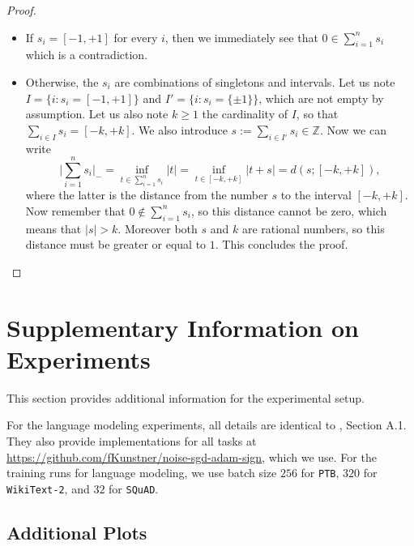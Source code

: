 \documentclass[10pt]{article} %
\begin{document}
\begin{proof}
\begin{itemize}
        \item If $s_i = [-1,+1]$ for every $i$, then we immediately see that $0 \in \sum_{i=1}^n s_i$ which is a contradiction.
        \item Otherwise, the $s_i$ are combinations of singletons and intervals. Let us note $I = \{i : s_i = [-1,+1]\}$ and $I' = \{i : s_i = \{ \pm 1\}\}$, which are not empty by assumption.
        Let us also note $k \geq 1$ the cardinality of $I$, so that $\sum_{i \in I} s_i = [- k , +k]$.
        We also introduce $s := \sum_{i \in I'} s_i \in \mathbb{Z}$.
        Now we can write
        \begin{equation*}
            \vert \sum_{i=1}^n s_i \vert_-
            =
            \inf\limits_{ t \in \sum_{i=1}^n s_i} \vert t \vert 
            =
            \inf\limits_{t \in [-k,+k]} \vert t + s \vert
            =
            d(s;[-k,+k]),
        \end{equation*}
        where the latter is the distance from the number $s$ to the interval $[-k,+k]$.
        Now remember that $0 \notin  \sum_{i=1}^n s_i$, so this distance cannot be zero, which means that $\vert s \vert > k$.
        Moreover both $s$ and $k$ are rational numbers, so  this distance must be greater or equal to $1$. This concludes the proof.
    \end{itemize}
\end{proof}






\section{Supplementary Information on Experiments}\label{sec:app-experiments-supp}
This section provides additional information for the experimental setup.

For the language modeling experiments, all details are identical to \citet{kunstner2023noise}, Section A.1. They also provide implementations for all tasks at \url{https://github.com/fKunstner/noise-sgd-adam-sign}, which we use.
For the training runs for language modeling, we use batch size $256$ for \texttt{PTB}, $320$ for \texttt{WikiText-2}, and $32$ for \texttt{SQuAD}.

\subsection{Additional Plots}\label{sec:app-fixed-weight-transformer}
\end{document}
